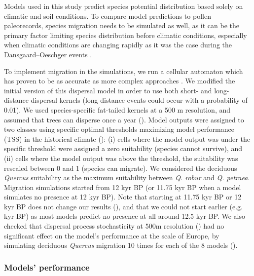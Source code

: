 Models used in this study predict species potential distribution based solely on climatic and soil conditions. To compare model predictions to pollen paleorecords, species migration needs to be simulated as well, as it can be the primary factor limiting species distribution before climatic conditions, especially when climatic conditions are changing rapidly as it was the case during the Dansgaard–Oeschger events \citep{Svenning2004, Saltre2013}.

To implement migration in the simulations, we run a  cellular automaton \citep{Engler2012} which has proven to be as accurate as more complex approaches \citep{Zurell2016}. We modified the initial version of this dispersal model in order to use both short- and long-distance dispersal kernels (long distance events could occur with a probability of 0.01). We used species-specific fat-tailed kernels \citep{Zani2022} at a 500 m resolution, and assumed that trees can disperse once a year (). Model outputs were assigned to two classes using specific optimal thresholds maximizing model performance (TSS) in the historical climate (): (i) cells where the model output was under the specific threshold were assigned a zero suitability (species cannot survive), and (ii) cells where the  model output was above the threshold, the suitability was rescaled between 0 and 1 (species can migrate). We considered the deciduous \emph{Quercus} suitability as the maximum suitability between \emph{Q. robur} and \emph{Q. petraea}. Migration simulations started from 12 kyr BP (or 11.75 kyr BP when a model simulates no presence at 12 kyr BP). Note that starting at 11.75 kyr BP or 12 kyr BP does not change our results (), and that we could not start earlier (e.g.  kyr BP) as most models predict no presence at all around 12.5 kyr BP. We also checked that dispersal process stochasticity at 500m resolution () had no significant effect on the model's performance at the scale of Europe, by simulating deciduous \emph{Quercus} migration 10 times for each of the 8 models (). 

\subsubsection{Models' performance}\label{skill}

